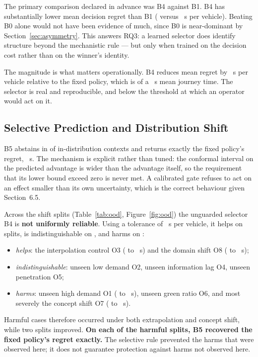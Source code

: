 The primary comparison declared in advance was B4 against B1. B4 has
substantially lower mean decision regret than B1 (\NumBFourRegret{} versus
\NumBOneRegret~s per vehicle). Beating B0 alone would not have been evidence of
much, since B0 is near-dominant by Section~\ref{sec:asymmetry}. This answers
RQ3: a learned selector does identify structure beyond the mechanistic rule ---
but only when trained on the decision cost rather than on the winner's identity.

The magnitude is what matters operationally. B4 reduces mean regret by
\NumBFourVsBZero~s per vehicle relative to the fixed policy, which is
\NumBFourVsBZeroPct{} of a \NumSBSMeanCost~s mean journey time. The selector is
real and reproducible, and below the threshold at which an operator would act on
it.

\subsection{Selective Prediction and Distribution Shift}

B5 abstains in \NumAbstainRate{} of in-distribution contexts and returns exactly
the fixed policy's regret, \NumBFiveRegret~s. The mechanism is explicit rather
than tuned: the conformal interval on the predicted advantage is wider than the
advantage itself, so the requirement that its lower bound exceed zero is never
met. A calibrated gate refuses to act on an effect smaller than its own
uncertainty, which is the correct behaviour given Section~6.5.

Across the \NumOODNTotal{} shift splits (Table~\ref{tab:ood},
Figure~\ref{fig:ood}) the unguarded selector B4 is \textbf{not uniformly
reliable}. Using a tolerance of \NumOODTolerance~s per vehicle, it helps on
\NumOODNHelps{} splits, is indistinguishable on \NumOODNNeutral{}, and harms on
\NumOODNHarms{}:
\begin{itemize}
\item \emph{helps}: the interpolation control O3 (\NumOODThreeMidBZero{} to
\NumOODThreeMidBFour~s) and the domain shift O8 (\NumOODEightNorthBZero{} to
\NumOODEightNorthBFour~s);
\item \emph{indistinguishable}: unseen low demand O2, unseen information lag
O4, unseen penetration O5;
\item \emph{harms}: unseen high demand O1 (\NumOODOneHighBZero{} to
\NumOODOneHighBFour~s), unseen green ratio O6, and most severely the concept
shift O7 (\NumOODSevenIncBZero{} to \NumOODSevenIncBFour~s).
\end{itemize}
Harmful cases therefore occurred under both extrapolation and concept shift,
while two splits improved. \textbf{On each of the \NumOODNHarms{} harmful splits,
B5 recovered the fixed policy's regret exactly.} The selective rule prevented
the harms that were observed here; it does not guarantee protection against
harms not observed here.

